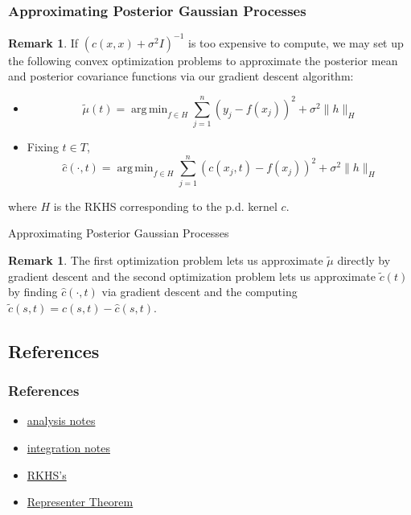 \documentclass[notheorems]{beamer}
\theoremstyle{definition}
\newtheorem{rem}[definition]{Remark}
\newcommand{\sig}{\sigma}
\DeclareMathOperator*{\argmin}{arg\,min}
\begin{document}
\begin{frame}
\frametitle{Approximating Posterior Gaussian Processes}
\begin{rem}
If $(c(x,x) + \sig^2I)^{-1}$ is too expensive to compute, we may set up the following convex optimization problems to approximate the posterior mean and posterior covariance functions via our gradient descent algorithm:
\begin{itemize}
\item $$\tilde{\mu}(t) = \argmin_{f \in H} \sum_{j=1}^n (y_j - f(x_j))^2 + \sig^2 \|h\|_H$$ 
\item Fixing $t \in T$, $$\hat{c}(\cdot, t) = \argmin_{f \in H} \sum_{j=1}^n (c(x_j, t) - f(x_j))^2 + \sig^2 \|h\|_H$$
\end{itemize}
where $H$ is the RKHS corresponding to the p.d. kernel $c$. \\
\end{rem}
\end{frame}










\begin{frame}
Approximating Posterior Gaussian Processes
\begin{rem}
The first optimization problem lets us approximate $\tilde{\mu}$ directly by gradient descent and the second optimization problem lets us approximate $\tilde{c}(t)$ by finding $\hat{c}(\cdot, t)$ via gradient descent and the computing $\tilde{c}(s, t) = c(s, t) - \hat{c}(s, t)$.
\end{rem}
\end{frame}


\begin{frame}
\section{References}
\frametitle{References}

\begin{itemize}
\item \href{https://github.com/carsonaj/Mathematics/blob/master/Introduction\%20to\%20Analysis/Introduction\%20to\%20Analysis.pdf}{analysis notes}

\item \href{https://github.com/carsonaj/Mathematics/blob/master/Introduction\%20to\%20Measure\%20and\%20Integration/Introduction\%20to\%20Measure\%20and\%20Integration.pdf}{integration notes}

\item \href{https://en.wikipedia.org/wiki/Reproducing_kernel_Hilbert_space}{RKHS's}

\item \href{https://en.wikipedia.org/wiki/Representer_theorem}{Representer Theorem}
\end{itemize}




\end{frame}
\end{document}
